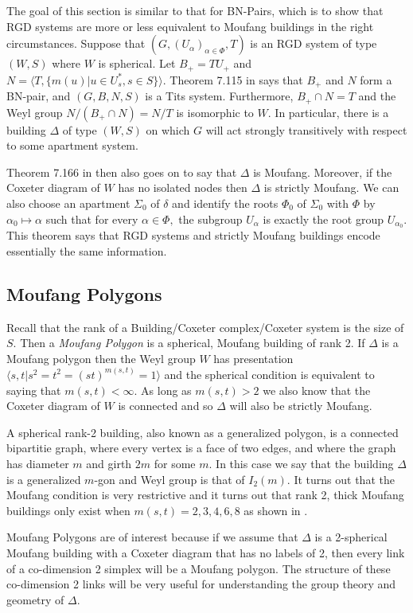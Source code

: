 \documentclass[class=book, crop=false,12 pt]{standalone}
\begin{document}
The goal of this section is similar to that for BN-Pairs, which is to show that RGD systems are more or less equivalent to Moufang buildings in the right circumstances. Suppose that $(G,(U_\alpha)_{\alpha\in \Phi},T)$ is an RGD system of type $(W,S)$ where $W$ is spherical. Let $B_+=TU_+$ and $N=\langle T,\{m(u)|u\in U_s^*, s\in S\}\rangle.$ Theorem 7.115 in \cite{buildings} says that $B_+$ and $N$ form a BN-pair, and $(G,B,N,S)$ is a Tits system. Furthermore, $B_+\cap N=T$ and the Weyl group $N/(B_+\cap N)=N/T$ is isomorphic to $W.$ In particular, there is a building $\Delta$ of type $(W,S)$ on which $G$ will act strongly transitively with respect to some apartment system.

Theorem 7.166 in \cite{buildings} then also goes on to say that $\Delta$ is Moufang. Moreover, if the Coxeter diagram of $W$ has no isolated nodes then $\Delta$ is strictly Moufang. We can also choose an apartment $\Sigma_0$ of $\delta$ and identify the roots $\Phi_0$ of $\Sigma_0$ with $\Phi$ by $\alpha_0\mapsto \alpha$ such that for every $\alpha\in \Phi,$ the subgroup $U_\alpha$ is exactly the root group $U_{\alpha_0}.$ This theorem says that RGD systems and strictly Moufang buildings encode essentially the same information.

\subsection{Moufang Polygons}
Recall that the rank of a Building/Coxeter complex/Coxeter system is the size of $S.$ Then a \emph{Moufang Polygon} is a spherical, Moufang building of rank 2. If $\Delta$ is a Moufang polygon then the Weyl group $W$ has presentation $\langle s,t|s^2=t^2=(st)^{m(s,t)}=1\rangle$ and the spherical condition is equivalent to saying that $m(s,t)<\infty.$ As long as $m(s,t)>2$ we also know that the Coxeter diagram of $W$ is connected and so $\Delta$ will also be strictly Moufang. 

A spherical rank-2 building, also known as a generalized polygon, is a connected bipartitie graph, where every vertex is a face of two edges, and where the graph has diameter $m$ and girth $2m$ for some $m.$ In this case we say that the building $\Delta$ is a generalized $m$-gon and Weyl group is that of $I_2(m).$ It turns out that the Moufang condition is very restrictive and it turns out that rank 2, thick Moufang buildings only exist when $m(s,t)=2,3,4,6,8$ as shown in \cite{poly}.

Moufang Polygons are of interest because if we assume that $\Delta$ is a 2-spherical Moufang building with a Coxeter diagram that has no labels of 2, then every link of a co-dimension 2 simplex will be a Moufang polygon. The structure of these co-dimension 2 links will be very useful for understanding the group theory and geometry of $\Delta.$ 
\end{document}
